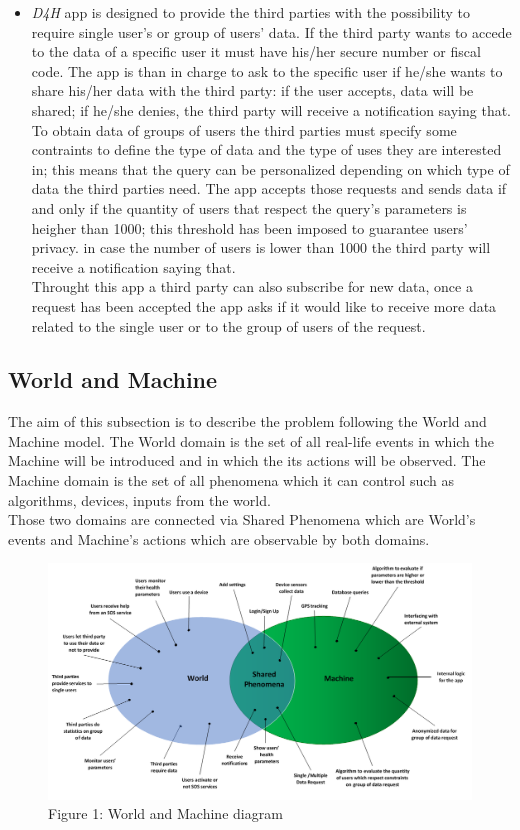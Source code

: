 \begin{itemize}
	\item{\textit{D4H} app is designed to provide the third parties with the possibility to require single user's or group of users' data.
		If the third party wants to accede to the data of  a specific user it must have his/her secure number or fiscal code. The app is than in charge to ask to the specific user if he/she wants to share his/her data with the third party: if the user accepts, data will be shared; if he/she denies, the third party will receive a notification saying that.\\
		To obtain data of groups of users the third parties must specify some contraints to define the type of data and the type of uses they are interested in; this means that the query can be personalized depending on which type of data the third parties need. The app accepts those requests and sends data if and only if the quantity of users that respect the query's parameters is heigher than 1000; this threshold has been imposed to guarantee users' privacy. in case the number of users is lower than 1000 the third party will receive a notification saying that.\\
		Throught this app a third party can also subscribe for new data, once a request has been accepted the app asks if it would like to receive more data related to the single user or to the group of users of the request.}
		
\end{itemize}

\subsection{World and Machine}
The aim of this subsection is to describe the problem following the World and Machine model. The World domain is the set of all real-life events in which the Machine will be introduced and in which the its actions will be observed. The Machine domain is the set of all phenomena which it can control such as algorithms, devices, inputs from the world.\\
Those two domains are connected via Shared Phenomena which are World's events and Machine's actions which are observable by both domains.

\begin{figure}[h!]
	\includegraphics[width=1.00\textwidth]{./pictures/world_machine.png}\par
	\caption{Figure 1: World and Machine diagram}
\end{figure}